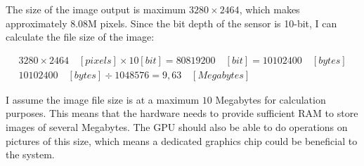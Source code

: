 The size of the image output is maximum $3280 \times 2464 $, which makes approximately 8.08M pixels. Since the bit depth of the sensor is 10-bit, I can calculate the file size of the image:

\begin{align*}
3280\times 2464 \quad[pixels] \times 10[bit] = 80819200\quad[bit] = 10102400\quad[bytes]\\
10102400\quad[bytes] \div1048576 = 9,63\quad[Megabytes]
\end{align*}

I assume the image file size is at a maximum $10$ Megabytes for calculation purposes. This means that the hardware needs to provide sufficient RAM to store images of several Megabytes. The GPU should also be able to do operations on pictures of this size, which means a dedicated graphics chip could be beneficial to the system.


















